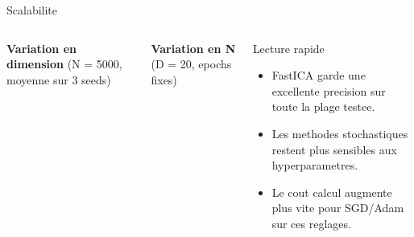 \documentclass[aspectratio=169,11pt]{beamer}
\begin{document}
\begin{frame}{Scalabilite}
  \small
  \begin{columns}[T,onlytextwidth]
    \textbf{Variation en dimension} (N = 5000, moyenne sur 3 seeds)
    \vspace{0.4em}


    \vspace{0.8em}
    \textbf{Variation en N} (D = 20, epochs fixes)
    \vspace{0.4em}


    \begin{block}{Lecture rapide}
      \begin{itemize}
        \item FastICA garde une excellente precision sur toute la plage testee.
        \item Les methodes stochastiques restent plus sensibles aux hyperparametres.
        \item Le cout calcul augmente plus vite pour SGD/Adam sur ces reglages.
      \end{itemize}
    \end{block}
  \end{columns}
\end{frame}
\end{document}
